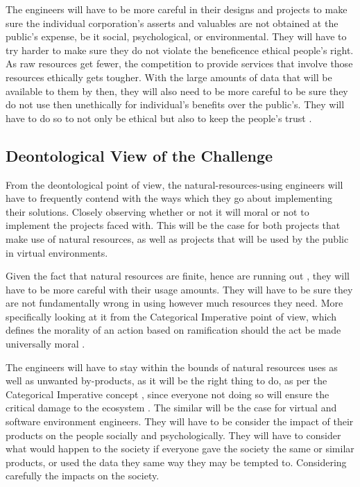 \documentclass[12pt]{witseiepaper}
\begin{document}
The engineers will have to be more careful in their designs and projects to make sure the individual corporation's asserts and valuables are not obtained at the public's expense, be it social, psychological, or environmental. They will have to try harder to make sure they do not violate the beneficence ethical people's right. 
As raw resources get fewer, the competition to provide services that involve those resources ethically gets tougher. With the large amounts of data that will be available to them by then, they will also need to be more careful to be sure they do not use then unethically for individual's benefits over the public's. They will have to do so to not only be ethical but also to keep the people's trust \cite{Masur2020, Smith2011}. 

    \subsection{Deontological View of the Challenge} 

    From the deontological point of view, the natural-resources-using engineers will have to frequently contend with the ways which they go about implementing their solutions. Closely observing whether or not it will moral or not to implement the projects faced with. This will be the case for both projects that make use of natural resources, as well as projects that will be used by the public in virtual environments.
    
    Given the fact that natural resources are finite, hence are running out \cite{subramanian2018crisis}, they will have to be more careful with their usage amounts. They will have to be sure they are not fundamentally wrong in using however much resources they need. More specifically looking at it from the Categorical Imperative point of view, which defines the morality of an action based on ramification should the act be made universally moral \cite{kant1993groundwork}.
    
    The engineers will have to stay within the bounds of natural resources uses as well as unwanted by-products, as it will be the right thing to do, as per the Categorical Imperative concept \cite{basara2018kant}, since everyone not doing so will ensure the critical damage to the ecosystem \cite{appannagari2017environmental}. The similar will be the case for virtual and software environment engineers. They will have to be consider the impact of their products on the people socially and psychologically. They will have to consider what would happen to the society if everyone gave the society the same or similar products, or used the data they same way they may be tempted to. Considering carefully the impacts on the society.  
    
\end{document}

